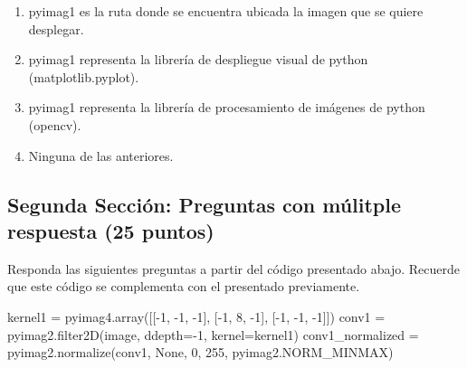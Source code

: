 \documentclass[12pt,a4paper]{article}
\newenvironment{Shaded}{\begin{snugshade}}{\end{snugshade}}
\newcommand{\DecValTok}[1]{\textcolor[rgb]{0.68,0.00,0.00}{#1}}
\newcommand{\NormalTok}[1]{\textcolor[rgb]{0.00,0.23,0.31}{#1}}
\newcommand{\OperatorTok}[1]{\textcolor[rgb]{0.37,0.37,0.37}{#1}}
\newcommand{\VariableTok}[1]{\textcolor[rgb]{0.07,0.07,0.07}{#1}}
\providecommand{\tightlist}{%
  \setlength{\itemsep}{0pt}\setlength{\parskip}{0pt}}\usepackage{longtable,booktabs,array}
\providecommand{\tightlist}{%
  \setlength{\itemsep}{0pt}\setlength{\parskip}{2pt}}
\begin{document}
\begin{enumerate}
  \begin{enumerate}
  \tightlist
  \item
    pyimag1 es la ruta donde se encuentra ubicada la imagen que se
    quiere desplegar.
  \item
    pyimag1 representa la librería de despliegue visual de python
    (matplotlib.pyplot).
  \item
    pyimag1 representa la librería de procesamiento de imágenes de
    python (opencv).
  \item
    Ninguna de las anteriores.
  \end{enumerate}
\end{enumerate}

\subsection{Segunda Sección: Preguntas con múlitple respuesta (25
puntos)}\label{segunda-secciuxf3n-preguntas-con-muxfalitple-respuesta-25-puntos}

Responda las siguientes preguntas a partir del código presentado abajo.
Recuerde que este código se complementa con el presentado previamente.

\label{segunda-secciuxf3n}
\begin{Shaded}
\begin{Highlighting}[]
\NormalTok{kernel1 }\OperatorTok{=}\NormalTok{ pyimag4.array([[}\OperatorTok{{-}}\DecValTok{1}\NormalTok{, }\OperatorTok{{-}}\DecValTok{1}\NormalTok{, }\OperatorTok{{-}}\DecValTok{1}\NormalTok{], [}\OperatorTok{{-}}\DecValTok{1}\NormalTok{, }\DecValTok{8}\NormalTok{, }\OperatorTok{{-}}\DecValTok{1}\NormalTok{], [}\OperatorTok{{-}}\DecValTok{1}\NormalTok{, }\OperatorTok{{-}}\DecValTok{1}\NormalTok{, }\OperatorTok{{-}}\DecValTok{1}\NormalTok{]])}
\NormalTok{conv1 }\OperatorTok{=}\NormalTok{ pyimag2.filter2D(image, ddepth}\OperatorTok{={-}}\DecValTok{1}\NormalTok{, kernel}\OperatorTok{=}\NormalTok{kernel1)}
\NormalTok{conv1\_normalized }\OperatorTok{=}\NormalTok{ pyimag2.normalize(conv1, }\VariableTok{None}\NormalTok{, }\DecValTok{0}\NormalTok{, }\DecValTok{255}\NormalTok{, pyimag2.NORM\_MINMAX)}
\end{Highlighting}
\end{Shaded}
\end{document}
